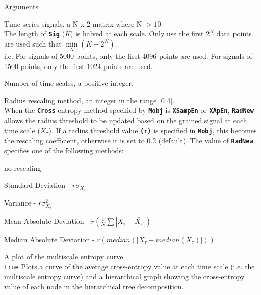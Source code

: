 \documentclass[12pt, a4paper, titlepage, openany]{book}
\begin{document}
\noindent \ul{Arguments}
\begin{description}[labelsep=1cm, labelwidth=2cm, nosep, style=multiline,leftmargin=3cm]\footnotesize
\item[\texttt{Sig}]		Time series signals, a N x 2 matrix where N $> 10$.\\
	The length of \texttt{\textbf{Sig}} (\emph{K}) is halved at each scale. Only use the first $2^N$ data points are used such that $\underset{N}{\min}(K - 2^N)$.\\
i.e. For signals of 5000 points, only the first 4096 points are used. For signals of 1500 points, only the first 1024 points are used.
\item[\texttt{Scales}]		Number of time scales, a positive integer.
\item[\texttt{RadNew}]			Radius rescaling method, an integer in the range [0 4].\\
				 When the \texttt{\textbf{Cross}}-entropy method specified by \texttt{\textbf{Mobj}} is \texttt{\textbf{XSampEn}} or \texttt{\textbf{XApEn}}, \texttt{\textbf{RadNew}} allows the radius threshold to be updated based on the grained signal at each time scale ($X_\tau$). If a radius threshold value \texttt{\textbf{(r)}} is specified in \texttt{\textbf{Mobj}},  this becomes the rescaling coefficient, otherwise it is set to 0.2 (default). The value of \texttt{\textbf{RadNew}} specifies one of the following methods:
	\begin{description}[labelsep=5em, labelwidth=4em, nosep,style=multiline,leftmargin=2cm]
		\item[0]	no rescaling
		\item[1]    Standard Deviation          - $r\sigma_{X_\tau}$
        \item[2]    Variance                    - $r\sigma_{X_\tau}^2$
        \item[3]    Mean Absolute Deviation     - $r(\frac{1}{N} \sum |X_{\tau} - \bar{X_{\tau}}|) $
        \item[4]    Median Absolute Deviation   - $r(median(|X_{\tau} - median(X_{\tau})|)) $
	\end{description} 
\item[\texttt{Plotx}]		A plot of the multiscale entropy curve\\
		\texttt{true} \hspace{15pt} Plots a curve of the average cross-entropy value at each time scale (i.e. the multiscale entropy curve) and a hierarchical graph showing the cross-entropy value of each node in the hierarchical tree decomposition.\\

\end{description}
\end{document}
